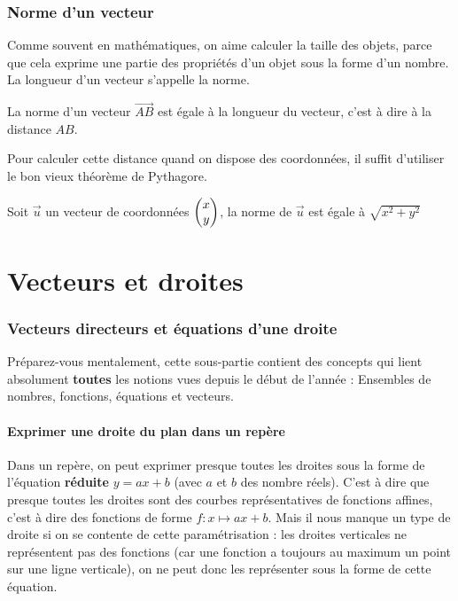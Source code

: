 \documentclass[10pt,a4paper,oneside]{book}
\begin{document}
\subsection{Norme d'un vecteur}

Comme souvent en mathématiques, on aime calculer la taille des objets, parce que cela exprime une partie des propriétés d'un objet sous la forme d'un nombre. La longueur d'un vecteur s'appelle la norme.

\begin{de}
  La norme d'un vecteur $\overrightarrow{AB}$ est égale à la longueur du vecteur, c'est à dire à la distance $AB$.
\end{de}

Pour calculer cette distance quand on dispose des coordonnées, il suffit d'utiliser le bon vieux théorème de Pythagore.

\begin{prop}
  Soit $\overrightarrow{u}$ un vecteur de coordonnées $ \begin{pmatrix} x\\ y \end{pmatrix}$, la norme de $\overrightarrow{u}$ est égale à $\sqrt{x^2+y^2}$
\end{prop}


\chapter{Vecteurs et droites}

\subsection{Vecteurs directeurs et équations d'une droite}

Préparez-vous mentalement, cette sous-partie contient des concepts qui lient absolument \textbf{toutes} les notions vues depuis le début de l'année : Ensembles de nombres, fonctions, équations et vecteurs.

\subsubsection{Exprimer une droite du plan dans un repère}

Dans un repère, on peut exprimer presque toutes les droites sous la forme de l'équation \textbf{réduite} $y=ax+b$ (avec $a$ et $b$ des nombre réels). C'est à dire que presque toutes les droites sont des courbes représentatives de fonctions affines, c'est à dire des fonctions de forme $f : x \mapsto ax+b$. Mais il nous manque un type de droite si on se contente de cette paramétrisation : les droites verticales ne représentent pas des fonctions (car une fonction a toujours au maximum un point sur une ligne verticale), on ne peut donc les représenter sous la forme de cette équation.
\end{document}
